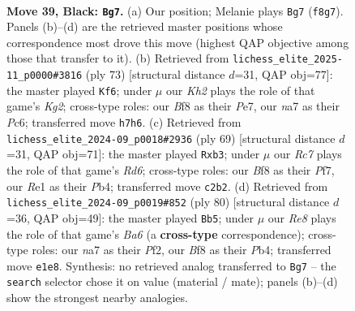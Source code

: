 \documentclass[11pt]{article}
\begin{document}
\clearpage

\begin{figure}[p]\centering
\begin{subfigure}{0.46\textwidth}\centering
\resizebox{\linewidth}{!}{%
\newchessgame
\chessboard[
  setfen={5b2/Np5k/6p1/5p1p/P7/6P1/RPr2PKP/4r3 b - - 0 39},
  showmover=false,
  pgfstyle=straightmove, color=movearrow, markmove={f8-g7}
]}
\caption{}
\end{subfigure}\hfill
\begin{subfigure}{0.46\textwidth}\centering
\resizebox{\linewidth}{!}{%
\newchessgame
\chessboard[
  setfen={1R6/4ppk1/2p3p1/7p/P6P/1P4P1/1r3PK1/8 b - - 2 37},
  showmover=false,
  pgfstyle=straightmove, color=movearrow, markmove={g7-f6}
]}
\caption{}
\end{subfigure}
\\[4pt]
\begin{subfigure}{0.46\textwidth}\centering
\resizebox{\linewidth}{!}{%
\newchessgame
\chessboard[
  setfen={3R4/5ppk/4p2p/8/Pp1P4/1P1r3P/5PPK/8 b - - 4 35},
  showmover=false,
  pgfstyle=straightmove, color=movearrow, markmove={d3-b3}
]}
\caption{}
\end{subfigure}\hfill
\begin{subfigure}{0.46\textwidth}\centering
\resizebox{\linewidth}{!}{%
\newchessgame
\chessboard[
  setfen={4r3/p7/BpR1pkn1/5p2/1P4p1/P3K1P1/5P2/8 w - - 3 41},
  showmover=false,
  pgfstyle=straightmove, color=movearrow, markmove={a6-b5}
]}
\caption{}
\end{subfigure}
\caption{\textbf{Move 39, Black: \texttt{Bg7}.} (a) Our position; Melanie plays \texttt{Bg7} (\texttt{f8g7}). Panels (b)--(d) are the retrieved master positions whose correspondence most drove this move (highest QAP objective among those that transfer to it). (b) Retrieved from \texttt{lichess\_elite\_2025-11\_p0000\#3816} (ply 73) [structural distance $d$=31, QAP obj=77]: the master played \texttt{Kf6}; under $\mu$ our \emph{Kh2} plays the role of that game's \emph{Kg2}; cross-type roles: our \emph{B}f8 as their \emph{P}e7, our \emph{n}a7 as their \emph{P}c6; transferred move \texttt{h7h6}. (c) Retrieved from \texttt{lichess\_elite\_2024-09\_p0018\#2936} (ply 69) [structural distance $d$=31, QAP obj=71]: the master played \texttt{Rxb3}; under $\mu$ our \emph{Rc7} plays the role of that game's \emph{Rd6}; cross-type roles: our \emph{B}f8 as their \emph{P}f7, our \emph{R}e1 as their \emph{P}b4; transferred move \texttt{c2b2}. (d) Retrieved from \texttt{lichess\_elite\_2024-09\_p0019\#852} (ply 80) [structural distance $d$=36, QAP obj=49]: the master played \texttt{Bb5}; under $\mu$ our \emph{Re8} plays the role of that game's \emph{Ba6} (a \textbf{cross-type} correspondence); cross-type roles: our \emph{n}a7 as their \emph{P}f2, our \emph{B}f8 as their \emph{P}b4; transferred move \texttt{e1e8}. Synthesis: no retrieved analog transferred to \texttt{Bg7} -- the \texttt{search} selector chose it on value (material / mate); panels (b)--(d) show the strongest nearby analogies.}
\label{fig:thought-m77}
\end{figure}
\end{document}
